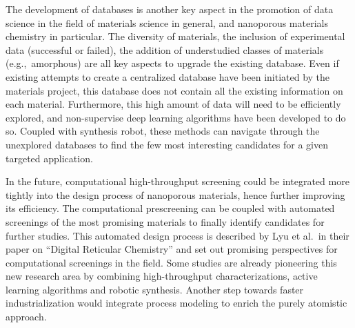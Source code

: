 \documentclass[main.tex]{subfiles}
\begin{document}
The development of databases is another key aspect in the promotion of data science in the field of materials science in general, and nanoporous materials chemistry in particular. The diversity of materials, the inclusion of experimental data (successful or failed), the addition of understudied classes of materials (e.g.,\ amorphous) are all key aspects to upgrade the existing database. Even if existing attempts to create a centralized database have been initiated by the materials project,\cite{MaterialsProject} this database does not contain all the existing information on each material. Furthermore, this high amount of data will need to be efficiently explored, and non-supervise deep learning algorithms have been developed to do so.\cite{Park_2023} Coupled with synthesis robot, these methods can navigate through the unexplored databases to find the few most interesting candidates for a given targeted application.

In the future, computational high-throughput screening could be integrated more tightly into the design process of nanoporous materials, hence further improving its efficiency. The computational prescreening can be coupled with automated screenings of the most promising materials to finally identify candidates for further studies. This automated design process is described by Lyu et al.\ in their paper on ``Digital Reticular Chemistry'' and set out promising perspectives for computational screenings in the field.\cite{Lyu_2020} Some studies are already pioneering this new research area by combining high-throughput characterizations, active learning algorithms and robotic synthesis.\cite{Greenaway_2018,Moosavi_2019} Another step towards faster industrialization would integrate process modeling to enrich the purely atomistic approach.

\OnlyInSubfile{\printglobalbibliography}
\end{document}

